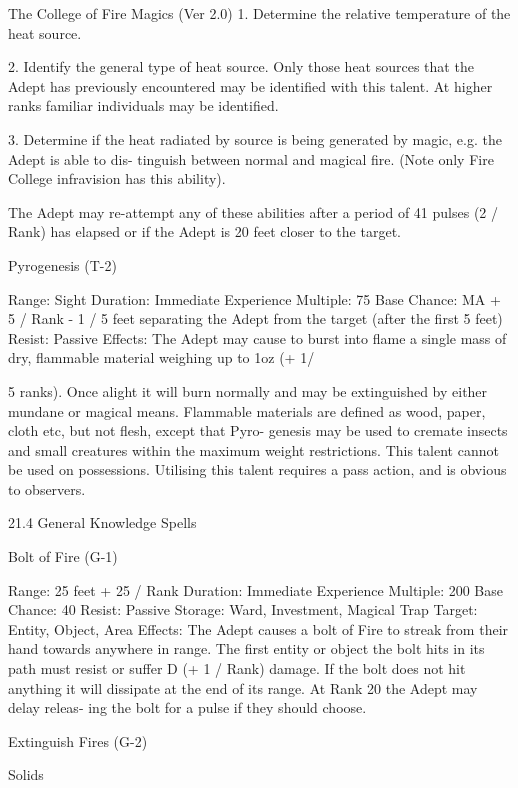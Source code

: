 \begin{Chapter}{The College of Fire Magics (Ver 2.0)}
1.  Determine  the  relative  temperature  of  the  heat 
source. 

2.  Identify  the  general  type  of  heat  source.  Only 
those  heat  sources  that  the  Adept  has  previously 
encountered  may  be  identified  with  this  talent.  At 
higher ranks familiar individuals may be identified. 

3. Determine if the heat radiated by source is being 
generated  by  magic,  e.g.  the  Adept  is  able  to  dis-
tinguish  between  normal  and  magical  fire.  (Note 
only Fire College infravision has this ability). 

The  Adept  may  re-attempt  any  of  these  abilities 
after a period of 41 pulses (2 / Rank) has elapsed or 
if the Adept is 20 feet closer to the target. 

Pyrogenesis (T-2) 

Range: Sight 
Duration: Immediate 
Experience Multiple: 75 
Base Chance: MA + 5 / Rank - 1 / 5 feet separating 
the Adept from the target (after the first 5 feet) 
Resist: Passive 
Effects: The Adept may cause to burst into flame a 
single  mass  of  dry,  flammable  material  weighing 
up to 1oz (+ 1/ 

5 ranks). Once alight it will burn normally and may 
be  extinguished  by  either  mundane  or  magical 
means.  Flammable  materials  are  defined  as  wood, 
paper,  cloth  etc,  but  not  flesh,  except  that  Pyro-
genesis  may  be  used  to  cremate  insects  and  small 
creatures  within  the  maximum  weight  restrictions. 
This talent cannot be used on possessions. Utilising 
this talent requires a pass action, and is obvious to 
observers. 

21.4 General Knowledge Spells 

Bolt of Fire (G-1) 

Range: 25 feet + 25 / Rank 
Duration: Immediate 
Experience Multiple: 200 
Base Chance: 40%
Resist: Passive 
Storage: Ward, Investment, Magical Trap 
Target: Entity, Object, Area 
Effects:  The  Adept  causes  a  bolt  of  Fire  to  streak 
from  their  hand  towards  anywhere  in  range.  The 
first  entity  or  object  the  bolt  hits  in  its  path  must 
resist  or  suffer  D  (+  1  / Rank)  damage.  If  the  bolt 
does not hit anything it will dissipate at the end of 
its range. At Rank 20 the Adept may delay releas-
ing the bolt for a pulse if they should choose. 

Extinguish Fires (G-2) 

Solids 


\end{Chapter}
